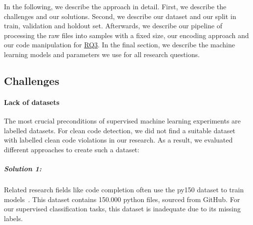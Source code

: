 In the following, we describe the approach in detail. First, we describe the challenges and our solutions. Second, we describe our dataset and our split in train, validation and holdout set. Afterwards, we describe our pipeline of processing the raw files into samples with a fixed size, our encoding approach and our code manipulation for \hyperref[rq:3]{RQ3}. In the final section, we describe the machine learning models and parameters we use for all research questions.

\subsection{Challenges}
\paragraph{Lack of datasets}
The most crucial preconditions of supervised machine learning experiments are labelled datasets. For clean code detection, we did not find a suitable dataset with labelled clean code violations in our research. 
As a result, we evaluated different approaches to create such a dataset:

\subparagraph{Solution 1:}
Related research fields like code completion often use the py150 dataset to train models~\cite{raychev2016probabilistic}. This dataset contains 150.000 python files, sourced from GitHub. For our supervised classification tasks, this dataset is inadequate due to its missing labels.  

